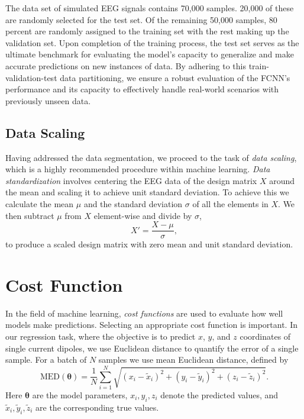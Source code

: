 \documentclass[a4paper, UKenglish, 11pt]{uiomaster}
\begin{document}
The data set of simulated EEG signals contains 70,000 samples. 20,000 of these are randomly selected for the test set. Of the remaining 50,000 samples, 80 percent are randomly assigned to the training set with the rest making up the validation set.
Upon completion of the training process, the test set serves as the ultimate benchmark for evaluating the model's capacity to generalize and make accurate predictions on new instances of data. By adhering to this train-validation-test data partitioning, we ensure a robust evaluation of the FCNN's performance and its capacity to effectively handle real-world scenarios with previously unseen data.



\subsection{Data Scaling}

Having addressed the data segmentation, we proceed to the task of \emph{data scaling}, which is a highly recommended procedure within machine learning. \emph{Data standardization} involves centering the EEG data of the design matrix \(X\) around the mean and scaling it to achieve unit standard deviation. To achieve this we calculate the mean \(\mu\) and the standard deviation $\sigma$ of all the elements in \(X\). We then subtract \(\mu\) from \(X\) element-wise and divide by \(\sigma\),
\begin{equation}
  X' = \frac{X - \mu}{\sigma},
\end{equation}
to produce a scaled design matrix with zero mean and unit standard deviation.





\section{Cost Function}

In the field of machine learning, \emph{cost functions} are used to evaluate how well models make predictions.
Selecting an appropriate cost function is important. In our regression task, where the objective is to predict $x$, $y$, and $z$ coordinates of single current dipoles, we use Euclidean distance to quantify the error of a single sample. For a batch of \(N\) samples we use mean Euclidean distance, defined by
\begin{equation}
  \text{MED}(\boldsymbol{\theta})
    = \frac{1}{N} \sum_{i=1}^{N}
        \sqrt{(x_i - \tilde{x}_i)^2 + (y_i - \tilde{y}_i)^2 + (z_i - \tilde{z}_i)^2}.
  \label{eq:MED}
\end{equation}
Here $\boldsymbol{\theta}$ are the model parameters,
\(x_i, y_i, z_i\)
denote the predicted values, and $\tilde{x}_i, \tilde{y}_i, \tilde{z}_i$ are the corresponding true values.
\end{document}
